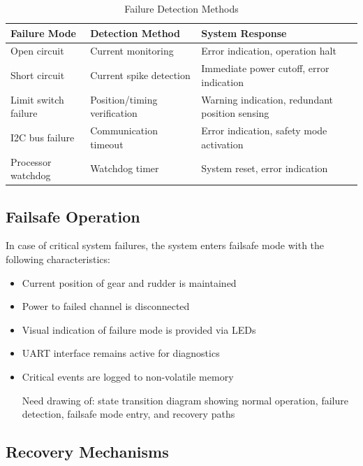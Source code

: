 \documentclass[12pt,a4paper,twoside,openright]{book}
\newcommand{\tabletextfont}{\normalfont\rmfamily}
\newcommand{\tableheadfont}{\normalfont\bfseries}
\begin{document}
\begin{table}[h]
\centering
\setlength{\tabcolsep}{4pt} %
\begin{tabular}{|p{}|p{}|p{}|}
\hline
\tableheadfont\textbf{Failure Mode} & \tableheadfont\textbf{Detection Method} & \tableheadfont\textbf{System Response} \\
\hline
\tabletextfont Open circuit & Current monitoring & Error indication, operation halt \\
\hline
\tabletextfont Short circuit & Current spike detection & Immediate power cutoff, error indication \\
\hline
\tabletextfont Limit switch failure & Position/timing verification & Warning indication, redundant position sensing \\
\hline
\tabletextfont I2C bus failure & Communication timeout & Error indication, safety mode activation \\
\hline
\tabletextfont Processor watchdog & Watchdog timer & System reset, error indication \\
\hline
\end{tabular}
\caption{Failure Detection Methods}
\end{table}

\subsection{Failsafe Operation}

In case of critical system failures, the system enters failsafe mode with the following characteristics:

\begin{itemize}
    \item Current position of gear and rudder is maintained
    \item Power to failed channel is disconnected
    \item Visual indication of failure mode is provided via LEDs
    \item UART interface remains active for diagnostics
    \item Critical events are logged to non-volatile memory
    \item [Need drawing of: state transition diagram showing normal operation, failure detection, failsafe mode entry, and recovery paths]
\end{itemize}

\subsection{Recovery Mechanisms}
\end{document}
